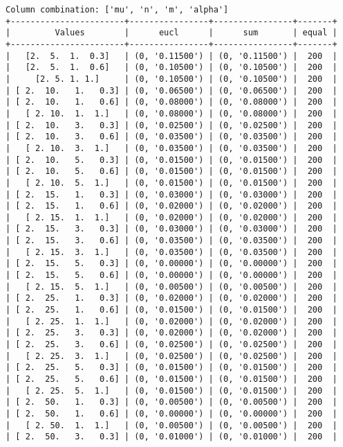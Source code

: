 \documentclass{article}
\begin{document}
\begin{verbatim}
Column combination: ['mu', 'n', 'm', 'alpha']
+-----------------------+----------------+----------------+-------+
|         Values        |      eucl      |      sum       | equal |
+-----------------------+----------------+----------------+-------+
|   [2.  5.  1.  0.3]   | (0, '0.11500') | (0, '0.11500') |  200  |
|   [2.  5.  1.  0.6]   | (0, '0.10500') | (0, '0.10500') |  200  |
|     [2. 5. 1. 1.]     | (0, '0.10500') | (0, '0.10500') |  200  |
| [ 2.  10.   1.   0.3] | (0, '0.06500') | (0, '0.06500') |  200  |
| [ 2.  10.   1.   0.6] | (0, '0.08000') | (0, '0.08000') |  200  |
|   [ 2. 10.  1.  1.]   | (0, '0.08000') | (0, '0.08000') |  200  |
| [ 2.  10.   3.   0.3] | (0, '0.02500') | (0, '0.02500') |  200  |
| [ 2.  10.   3.   0.6] | (0, '0.03500') | (0, '0.03500') |  200  |
|   [ 2. 10.  3.  1.]   | (0, '0.03500') | (0, '0.03500') |  200  |
| [ 2.  10.   5.   0.3] | (0, '0.01500') | (0, '0.01500') |  200  |
| [ 2.  10.   5.   0.6] | (0, '0.01500') | (0, '0.01500') |  200  |
|   [ 2. 10.  5.  1.]   | (0, '0.01500') | (0, '0.01500') |  200  |
| [ 2.  15.   1.   0.3] | (0, '0.03000') | (0, '0.03000') |  200  |
| [ 2.  15.   1.   0.6] | (0, '0.02000') | (0, '0.02000') |  200  |
|   [ 2. 15.  1.  1.]   | (0, '0.02000') | (0, '0.02000') |  200  |
| [ 2.  15.   3.   0.3] | (0, '0.03000') | (0, '0.03000') |  200  |
| [ 2.  15.   3.   0.6] | (0, '0.03500') | (0, '0.03500') |  200  |
|   [ 2. 15.  3.  1.]   | (0, '0.03500') | (0, '0.03500') |  200  |
| [ 2.  15.   5.   0.3] | (0, '0.00000') | (0, '0.00000') |  200  |
| [ 2.  15.   5.   0.6] | (0, '0.00000') | (0, '0.00000') |  200  |
|   [ 2. 15.  5.  1.]   | (0, '0.00500') | (0, '0.00500') |  200  |
| [ 2.  25.   1.   0.3] | (0, '0.02000') | (0, '0.02000') |  200  |
| [ 2.  25.   1.   0.6] | (0, '0.01500') | (0, '0.01500') |  200  |
|   [ 2. 25.  1.  1.]   | (0, '0.02000') | (0, '0.02000') |  200  |
| [ 2.  25.   3.   0.3] | (0, '0.02000') | (0, '0.02000') |  200  |
| [ 2.  25.   3.   0.6] | (0, '0.02500') | (0, '0.02500') |  200  |
|   [ 2. 25.  3.  1.]   | (0, '0.02500') | (0, '0.02500') |  200  |
| [ 2.  25.   5.   0.3] | (0, '0.01500') | (0, '0.01500') |  200  |
| [ 2.  25.   5.   0.6] | (0, '0.01500') | (0, '0.01500') |  200  |
|   [ 2. 25.  5.  1.]   | (0, '0.01500') | (0, '0.01500') |  200  |
| [ 2.  50.   1.   0.3] | (0, '0.00500') | (0, '0.00500') |  200  |
| [ 2.  50.   1.   0.6] | (0, '0.00000') | (0, '0.00000') |  200  |
|   [ 2. 50.  1.  1.]   | (0, '0.00500') | (0, '0.00500') |  200  |
| [ 2.  50.   3.   0.3] | (0, '0.01000') | (0, '0.01000') |  200  |

\end{verbatim}
\end{document}
